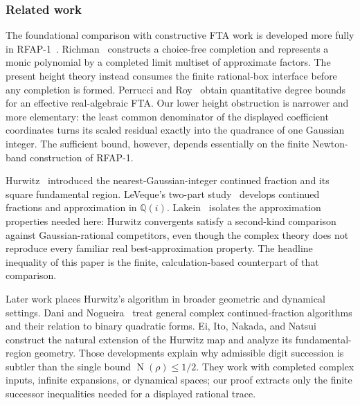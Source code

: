 \documentclass[11pt]{article}
\newcommand{\Q}{\mathbb{Q}}
\newcommand{\Norm}[1]{\operatorname{N}\!\left(#1\right)}
\begin{document}
\subsubsection{Related work}
\label{sec:related-work}

The foundational comparison with constructive FTA work is developed more
fully in RFAP-1~\cite{RFAPOne}.  Richman~\cite{Richman} constructs a
choice-free completion and represents a monic polynomial by a completed limit
multiset of approximate factors.  The present height theory instead consumes
the finite rational-box interface before any completion is formed.  Perrucci
and Roy~\cite{PerrucciRoyQuantitative} obtain quantitative degree bounds for
an effective real-algebraic FTA.  Our lower height obstruction is narrower and
more elementary: the least common denominator of the displayed coefficient
coordinates turns its scaled residual exactly into the quadrance of one
Gaussian integer.  The sufficient bound, however, depends essentially on the
finite Newton-band construction of RFAP-1.

Hurwitz~\cite{HurwitzComplexCF} introduced the nearest-Gaussian-integer
continued fraction and its square fundamental region.  LeVeque's two-part
study~\cite{LeVequeGaussianCF} develops continued fractions and approximation
in $\Q(i)$.  Lakein~\cite{LakeinApproximation} isolates the approximation
properties needed here: Hurwitz convergents satisfy a second-kind comparison
against Gaussian-rational competitors, even though the complex theory does
not reproduce every familiar real best-approximation property.  The headline
inequality of this paper is the finite, calculation-based counterpart of that
comparison.

Later work places Hurwitz's algorithm in broader geometric and dynamical
settings.  Dani and Nogueira~\cite{DaniNogueira} treat general complex
continued-fraction algorithms and their relation to binary quadratic forms.
Ei, Ito, Nakada, and Natsui~\cite{EiItoNakadaNatsui} construct the natural
extension of the Hurwitz map and analyze its fundamental-region geometry.
Those developments explain why admissible digit succession is subtler than
the single bound $\Norm\rho\le1/2$.  They work with completed complex inputs,
infinite expansions, or dynamical spaces; our proof extracts only the finite
successor inequalities needed for a displayed rational trace.
\end{document}
